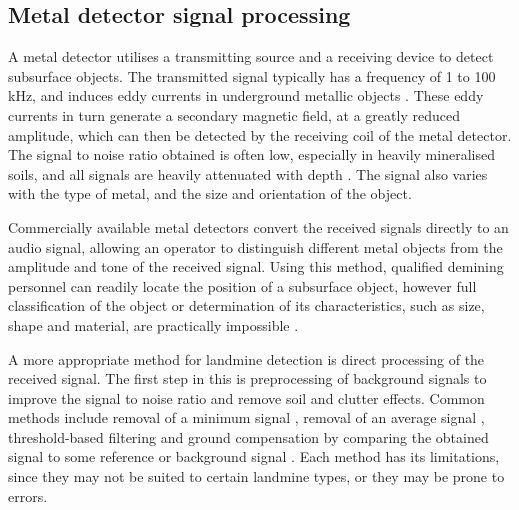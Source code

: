 \documentclass[main.tex]{subfiles}
\begin{document}
\subsection{Metal detector signal processing}
A metal detector utilises a transmitting source and a receiving device to detect subsurface objects. The transmitted signal typically has a frequency of 1 to 100 kHz, and induces eddy currents in underground metallic objects \parencite{bruschini2000phase}. These eddy currents in turn generate a secondary magnetic field, at a greatly reduced amplitude, which can then be detected by the receiving coil of the metal detector. The signal to noise ratio obtained is often low, especially in heavily mineralised soils, and all signals are heavily attenuated with depth \parencite{Candy2008}. The signal also varies with the type of metal, and the size and orientation of the object.

Commercially available metal detectors convert the received signals directly to an audio signal, allowing an operator to distinguish different metal objects from the amplitude and tone of the received signal. Using this method, qualified demining personnel can readily locate the position of a subsurface object, however full classification of the object or determination of its characteristics, such as size, shape and material, are practically impossible \parencite{Kruger2006}.

A more appropriate method for landmine detection is direct processing of the received signal. The first step in this is preprocessing of background signals to improve the signal to noise ratio and remove soil and clutter effects. Common methods include removal of a minimum signal \parencite{bhatia2000sensor}, removal of an average signal \parencite{bruschini02}, threshold-based  filtering \parencite{tran2009evaluation}  and ground compensation by comparing the obtained signal to some reference or background signal \parencite{Kruger2006}. Each method has its limitations, since they may not be suited to certain landmine types, or they may be prone to errors. 
\end{document}
